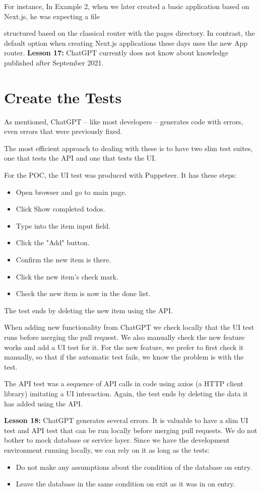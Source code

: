 \documentclass[runningheads]{llncs}
\begin{document}
For instance, In Example 2, when we later created a basic application based on Next.js, he was expecting a file
 
structured based on the classical router with the pages directory. In contrast, the default option when creating Next.js applications these days uses the new App router.
\textbf{Lesson 17:} ChatGPT currently does not know about knowledge published after September 2021.

\section{Create the Tests}
As mentioned, ChatGPT – like most developers – generates code with errors, even errors that were previously fixed.

The most efficient approach to dealing with these is to have two slim test suites, one that tests the API and one that tests the UI.

For the POC, the UI test was produced with Puppeteer. It has these steps:
\begin{itemize}
    \item Open browser and go to main page.
    \item Click Show completed todos.
    \item Type into the item input field.
    \item Click the "Add" button.
    \item Confirm the new item is there.
    \item Click the new item's check mark.
    \item Check the new item is now in the done list.
\end{itemize}

The test ends by deleting the new item using the API.

When adding new functionality from ChatGPT we check locally that the UI test runs before merging the pull request. We also manually check the new feature works and add a UI test for it. For the new feature, we prefer to first check it manually, so that if the automatic test fails, we know the problem is with the test.

The API test was a sequence of API calls in code using axios (a HTTP client library) imitating a UI interaction. Again, the test ends by deleting the data it has added using the API.

\textbf{Lesson 18:} ChatGPT generates several errors. It is valuable to have a slim UI test and API test that can be run locally before merging pull requests.
We do not bother to mock database or service layer. Since we have the development environment running locally, we can rely on it as long as the tests:
\begin{itemize}
    \item Do not make any assumptions about the condition of the database on entry.
    \item Leave the database in the same condition on exit as it was in on entry.
\end{itemize}
\end{document}
